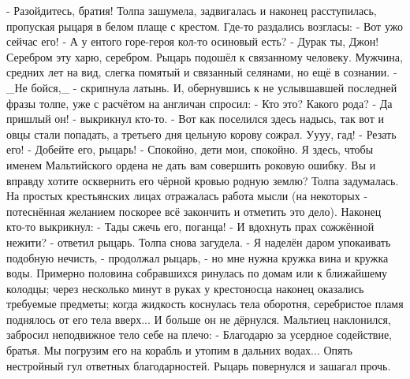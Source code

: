  - Разойдитесь, братия!
Толпа зашумела, задвигалась и наконец расступилась, пропуская рыцаря в белом плаще с крестом. Где-то раздались возгласы:
 - Вот ужо сейчас его!
 - А у ентого горе-героя кол-то осиновый есть?
 - Дурак ты, Джон! Серебром эту харю, серебром.
Рыцарь подошёл к связанному человеку. Мужчина, средних лет на вид, слегка помятый и связанный селянами, но ещё в сознании.
 - \_Не бойся,\_ - скрипнула латынь.
И, обернувшись к не услывшавшей последней фразы толпе, уже с расчётом на англичан спросил:
 - Кто это? Какого рода?
 - Да пришлый он! - выкрикнул кто-то. - Вот как поселился здесь надысь, так вот и овцы стали попадать, а третьего дня цельную корову сожрал. Уууу, гад!
 - Резать его!
 - Добейте его, рыцарь!
 - Спокойно, дети мои, спокойно. Я здесь, чтобы именем Мальтийского ордена не дать вам совершить роковую ошибку. Вы и вправду хотите осквернить его чёрной кровью родную землю?
Толпа задумалась. На простых крестьянских лицах отражалась работа мысли (на некоторых - потеснённая желанием поскорее всё закончить и отметить это дело). Наконец кто-то выкрикнул:
 - Тады сжечь его, поганца!
 - И вдохнуть прах сожжённой нежити? - ответил рыцарь.
Толпа снова загудела.
 - Я наделён даром упокаивать подобную нечисть, - продолжал рыцарь, - но мне нужна кружка вина и кружка воды.
Примерно половина собравшихся ринулась по домам или к ближайшему колодцы; через несколько минут в руках у крестоносца наконец оказались требуемые предметы; когда жидкость коснулась тела оборотня, серебристое пламя поднялось от его тела вверх... И больше он не дёрнулся.
Мальтиец наклонился, забросил неподвижное тело себе на плечо:
 - Благодарю за усердное содействие, братья. Мы погрузим его на корабль и утопим в дальних водах...
Опять нестройный гул ответных благодарностей. Рыцарь повернулся и зашагал прочь.


